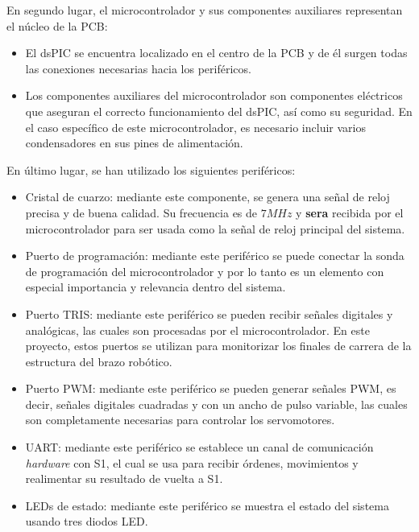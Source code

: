 En segundo lugar, el microcontrolador y sus componentes auxiliares representan el núcleo de la \ac{PCB}:
\begin{itemize}
    \item El dsPIC se encuentra localizado en el centro de la \ac{PCB} y de él surgen todas las conexiones necesarias hacia los periféricos.
    \item Los componentes auxiliares del microcontrolador son componentes eléctricos que aseguran el correcto funcionamiento del dsPIC, así como su seguridad. En el caso específico de este microcontrolador, es necesario incluir varios condensadores en sus pines de alimentación.
\end{itemize}

En último lugar, se han utilizado los siguientes periféricos:

\begin{itemize}
    \item Cristal de cuarzo: mediante este componente, se genera una señal de reloj precisa y de buena calidad. Su frecuencia es de $7MHz$ y \textbf{sera} recibida por el microcontrolador para ser usada como la señal de reloj principal del sistema.
    
    \item Puerto de programación: mediante este periférico se puede conectar la sonda de programación del microcontrolador y por lo tanto es un elemento con especial importancia y relevancia dentro del sistema.
    
    \item Puerto TRIS: mediante este periférico se pueden recibir señales digitales y analógicas, las cuales son procesadas por el microcontrolador. En este proyecto, estos puertos se utilizan para monitorizar los finales de carrera de la estructura del brazo robótico.
    \item Puerto PWM: mediante este periférico se pueden generar señales PWM, es decir, señales digitales cuadradas y con un ancho de pulso variable, las cuales son completamente necesarias para controlar los servomotores.
    
    \item UART: mediante este periférico se establece un canal de comunicación \textit{hardware} con S1, el cual se usa para recibir órdenes, movimientos y realimentar su resultado de vuelta a S1.
    
    \item LEDs de estado: mediante este periférico se muestra el estado del sistema usando tres diodos LED.
\end{itemize}

